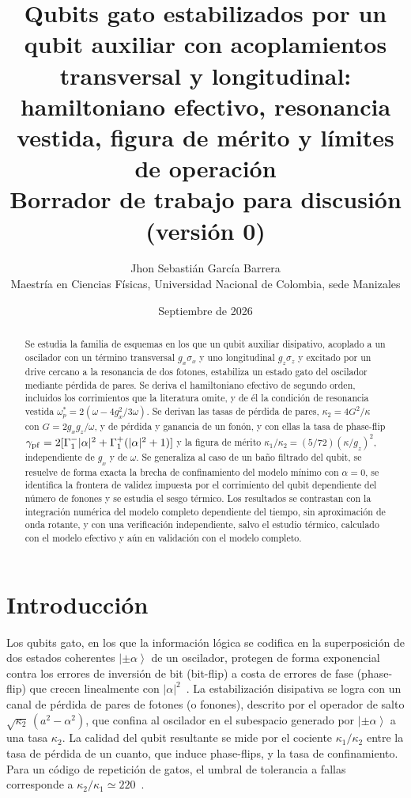\documentclass[11pt,a4paper]{article}
\title{Qubits gato estabilizados por un qubit auxiliar con acoplamientos transversal y longitudinal:\\
hamiltoniano efectivo, resonancia vestida, figura de mérito y límites de operación\\[1ex]
\large Borrador de trabajo para discusión (versión 0)}
\author{Jhon Sebastián García Barrera\\
\small Maestría en Ciencias Físicas, Universidad Nacional de Colombia, sede Manizales}
\date{Septiembre de 2026}
\newcommand{\ket}[1]{\left|#1\right\rangle}
\theoremstyle{definition}
\begin{document}
\maketitle

\begin{abstract}
Se estudia la familia de esquemas en los que un qubit auxiliar disipativo, acoplado a un oscilador con un término transversal $g_x\sigma_x$ y uno longitudinal $g_z\sigma_z$ y excitado por un drive cercano a la resonancia de dos fotones, estabiliza un estado gato del oscilador mediante pérdida de pares. Se deriva el hamiltoniano efectivo de segundo orden, incluidos los corrimientos que la literatura omite, y de él la condición de resonancia vestida $\omega_p^{*}=2(\omega-4g_x^2/3\omega)$. Se derivan las tasas de pérdida de pares, $\kappa_2=4G^2/\kappa$ con $G=2g_xg_z/\omega$, y de pérdida y ganancia de un fonón, y con ellas la tasa de phase-flip $\gamma_{\rm pf}=2[\Gamma_1^{-}|\alpha|^2+\Gamma_1^{+}(|\alpha|^2+1)]$ y la figura de mérito $\kappa_1/\kappa_2=(5/72)(\kappa/g_z)^2$, independiente de $g_x$ y de $\omega$. Se generaliza al caso de un baño filtrado del qubit, se resuelve de forma exacta la brecha de confinamiento del modelo mínimo con $\alpha=0$, se identifica la frontera de validez impuesta por el corrimiento del qubit dependiente del número de fonones y se estudia el sesgo térmico. Los resultados se contrastan con la integración numérica del modelo completo dependiente del tiempo, sin aproximación de onda rotante, y con una verificación independiente, salvo el estudio térmico, calculado con el modelo efectivo y aún en validación con el modelo completo.
\end{abstract}

\tableofcontents

\section{Introducción}
\label{sec:intro}

Los qubits gato, en los que la información lógica se codifica en la superposición de dos estados coherentes $\ket{\pm\alpha}$ de un oscilador, protegen de forma exponencial contra los errores de inversión de bit (bit-flip) a costa de errores de fase (phase-flip) que crecen linealmente con $|\alpha|^2$~\cite{GuillaudMirrahimi2021,Chamberland2022}. La estabilización disipativa se logra con un canal de pérdida de pares de fotones (o fonones), descrito por el operador de salto $\sqrt{\kappa_2}\,(a^2-\alpha^2)$, que confina al oscilador en el subespacio generado por $\ket{\pm\alpha}$ a una tasa $\kappa_2$. La calidad del qubit resultante se mide por el cociente $\kappa_1/\kappa_2$ entre la tasa de pérdida de un cuanto, que induce phase-flips, y la tasa de confinamiento. Para un código de repetición de gatos, el umbral de tolerancia a fallas corresponde a $\kappa_2/\kappa_1\simeq220$~\cite{GuillaudMirrahimi2021}.
\end{document}
